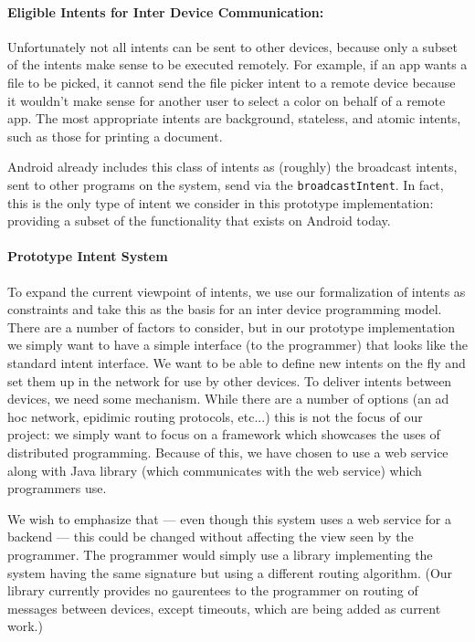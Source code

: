 \documentclass{acm_proc_article-sp}
\begin{document}
\paragraph*{Eligible Intents for Inter Device Communication:}

Unfortunately not all intents can be sent to other devices, because
only a subset of the intents make sense to be executed remotely.  For
example, if an app wants a file to be picked, it cannot send the file
picker intent to a remote device because it wouldn't make sense for
another user to select a color on behalf of a remote app.  The most
appropriate intents are background, stateless, and atomic intents,
such as those for printing a document.

Android already includes this class of intents as (roughly) the
broadcast intents, sent to other programs on the system, send via the
\texttt{broadcastIntent}.  In fact, this is the only type of intent we
consider in this prototype implementation: providing a subset of the
functionality that exists on Android today.

\paragraph*{Prototype Intent System}

To expand the current viewpoint of intents, we use our formalization
of intents as constraints and take this as the basis for an inter
device programming model.  There are a number of factors to consider,
but in our prototype implementation we simply want to have a simple
interface (to the programmer) that looks like the standard intent
interface.  We want to be able to define new intents on the fly and
set them up in the network for use by other devices.  To deliver
intents between devices, we need some mechanism.  While there are a
number of options (an ad hoc network, epidimic routing protocols,
etc...) this is not the focus of our project: we simply want to focus
on a framework which showcases the uses of distributed programming.
Because of this, we have chosen to use a web service along with Java
library (which communicates with the web service) which programmers
use.

We wish to emphasize that --- even though this system uses a web
service for a backend --- this could be changed without affecting the
view seen by the programmer.  The programmer would simply use a
library implementing the system having the same signature but using a
different routing algorithm.  (Our library currently provides no
gaurentees to the programmer on routing of messages between devices,
except timeouts, which are being added as current work.)
\end{document}
